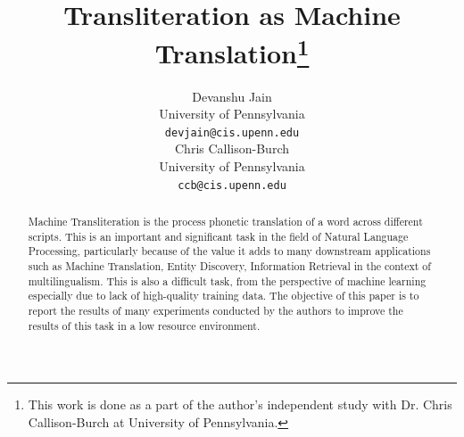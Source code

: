 \documentclass[11pt,a4paper]{article}
\title{Transliteration as Machine Translation\footnote{This work is done as a part of the author's independent study with Dr. Chris Callison-Burch at University of Pennsylvania.}}
\author{Devanshu Jain \\
  University of Pennsylvania \\
  {\tt devjain@cis.upenn.edu} \\\And
  Chris Callison-Burch \\
  University of Pennsylvania \\
  {\tt ccb@cis.upenn.edu} \\}
\date{}
\begin{document}
\maketitle
\begin{abstract}
Machine Transliteration is the process phonetic translation of a word across different scripts. This is an important and significant task in the field of Natural Language Processing, particularly because of the value it adds to many downstream applications such as Machine Translation, Entity Discovery, Information Retrieval in the context of multilingualism. This is also a difficult task, from the perspective of machine learning especially due to lack of high-quality training data. The objective of this paper is to report the results of many experiments conducted by the authors to improve the results of this task in a low resource environment.
\end{abstract}
\end{document}
